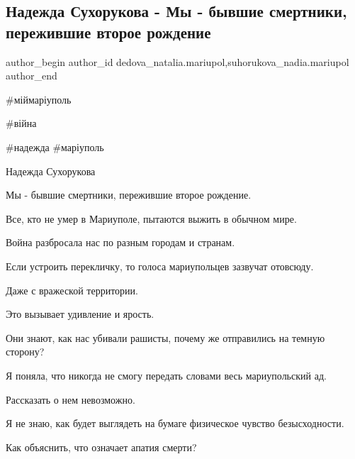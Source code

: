  
 
 
 
 

\subsection{Надежда Сухорукова - Мы - бывшие смертники, пережившие второе рождение}
\label{sec:12_01_2023.fb.dedova_natalia.mariupol.1.nadezhda_sukhorukova}
 
\ifcmt
 author_begin
   author_id dedova_natalia.mariupol,suhorukova_nadia.mariupol
 author_end
\fi

\#міймаріуполь

\#війна

\#надежда \#маріуполь

Надежда Сухорукова

Мы - бывшие смертники, пережившие второе рождение.

Все, кто не умер в Мариуполе, пытаются выжить в обычном мире.

Война разбросала нас по разным городам и странам.

Если устроить перекличку, то голоса мариупольцев зазвучат отовсюду.

Даже с вражеской территории.

Это вызывает удивление и ярость.

Они знают, как нас убивали рашисты, почему же отправились на темную сторону?

Я поняла, что никогда не смогу передать словами весь мариупольский  ад. 

Рассказать о нем невозможно.

Я не знаю, как будет выглядеть на бумаге физическое чувство безысходности.

Как объяснить, что означает апатия смерти? 

